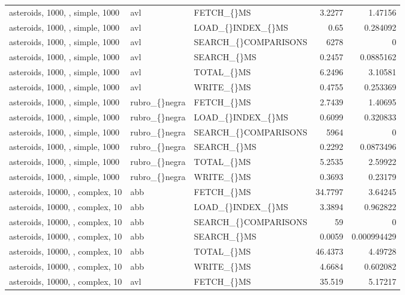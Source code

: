 \begin{longtable}{p{4cm}p{1.4cm}p{2.6cm}rr}
asteroids, 1000, , simple, 1000 & avl & FETCH\_\allowbreak\{\}MS & 3.2277 & 1.47156\\
asteroids, 1000, , simple, 1000 & avl & LOAD\_\allowbreak\{\}INDEX\_\allowbreak\{\}MS & 0.65 & 0.284092\\
asteroids, 1000, , simple, 1000 & avl & SEARCH\_\allowbreak\{\}COMPARISONS & 6278 & 0\\
asteroids, 1000, , simple, 1000 & avl & SEARCH\_\allowbreak\{\}MS & 0.2457 & 0.0885162\\
asteroids, 1000, , simple, 1000 & avl & TOTAL\_\allowbreak\{\}MS & 6.2496 & 3.10581\\
asteroids, 1000, , simple, 1000 & avl & WRITE\_\allowbreak\{\}MS & 0.4755 & 0.253369\\
asteroids, 1000, , simple, 1000 & rubro\_\allowbreak\{\}negra & FETCH\_\allowbreak\{\}MS & 2.7439 & 1.40695\\
asteroids, 1000, , simple, 1000 & rubro\_\allowbreak\{\}negra & LOAD\_\allowbreak\{\}INDEX\_\allowbreak\{\}MS & 0.6099 & 0.320833\\
asteroids, 1000, , simple, 1000 & rubro\_\allowbreak\{\}negra & SEARCH\_\allowbreak\{\}COMPARISONS & 5964 & 0\\
asteroids, 1000, , simple, 1000 & rubro\_\allowbreak\{\}negra & SEARCH\_\allowbreak\{\}MS & 0.2292 & 0.0873496\\
asteroids, 1000, , simple, 1000 & rubro\_\allowbreak\{\}negra & TOTAL\_\allowbreak\{\}MS & 5.2535 & 2.59922\\
asteroids, 1000, , simple, 1000 & rubro\_\allowbreak\{\}negra & WRITE\_\allowbreak\{\}MS & 0.3693 & 0.23179\\
asteroids, 10000, , complex, 10 & abb & FETCH\_\allowbreak\{\}MS & 34.7797 & 3.64245\\
asteroids, 10000, , complex, 10 & abb & LOAD\_\allowbreak\{\}INDEX\_\allowbreak\{\}MS & 3.3894 & 0.962822\\
asteroids, 10000, , complex, 10 & abb & SEARCH\_\allowbreak\{\}COMPARISONS & 59 & 0\\
asteroids, 10000, , complex, 10 & abb & SEARCH\_\allowbreak\{\}MS & 0.0059 & 0.000994429\\
asteroids, 10000, , complex, 10 & abb & TOTAL\_\allowbreak\{\}MS & 46.4373 & 4.49728\\
asteroids, 10000, , complex, 10 & abb & WRITE\_\allowbreak\{\}MS & 4.6684 & 0.602082\\
asteroids, 10000, , complex, 10 & avl & FETCH\_\allowbreak\{\}MS & 35.519 & 5.17217\\

\end{longtable}
